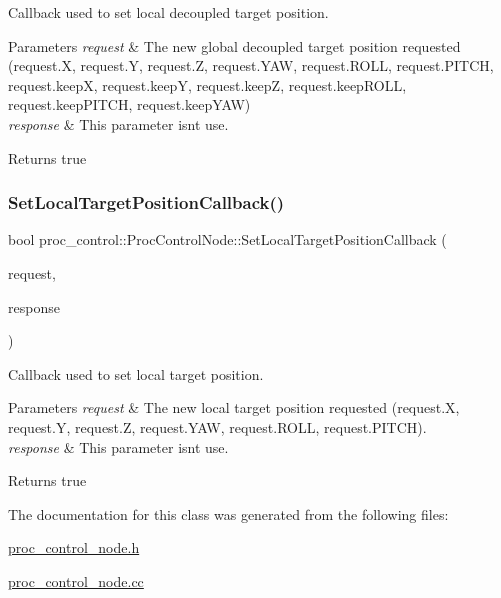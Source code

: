 Callback used to set local decoupled target position. 
\begin{DoxyParams}{Parameters}
{\em request} & The new global decoupled target position requested (request.\+X, request.\+Y, request.\+Z, request.\+Y\+AW, request.\+R\+O\+LL, request.\+P\+I\+T\+CH, request.\+keepX, request.\+keepY, request.\+keepZ, request.\+keep\+R\+O\+LL, request.\+keep\+P\+I\+T\+CH, request.\+keep\+Y\+AW) \\
\hline
{\em response} & This parameter isn\textquotesingle{}t use. \\
\hline
\end{DoxyParams}
\begin{DoxyReturn}{Returns}
true 
\end{DoxyReturn}
\mbox{\label{classproc__control_1_1_proc_control_node_ad331887883a3c1c44472d72dfced3db6}} 
\subsubsection{\texorpdfstring{Set\+Local\+Target\+Position\+Callback()}{SetLocalTargetPositionCallback()}}
{\footnotesize\ttfamily bool proc\+\_\+control\+::\+Proc\+Control\+Node\+::\+Set\+Local\+Target\+Position\+Callback (\begin{DoxyParamCaption}\item[{proc\+\_\+control\+::\+Set\+Position\+Target\+Request \&}]{request,  }\item[{proc\+\_\+control\+::\+Set\+Position\+Target\+Response \&}]{response }\end{DoxyParamCaption})}

Callback used to set local target position. 
\begin{DoxyParams}{Parameters}
{\em request} & The new local target position requested (request.\+X, request.\+Y, request.\+Z, request.\+Y\+AW, request.\+R\+O\+LL, request.\+P\+I\+T\+CH). \\
\hline
{\em response} & This parameter isn\textquotesingle{}t use. \\
\hline
\end{DoxyParams}
\begin{DoxyReturn}{Returns}
true 
\end{DoxyReturn}


The documentation for this class was generated from the following files\+:\begin{DoxyCompactItemize}
\item 
\hyperlink{proc__control__node_8h}{proc\+\_\+control\+\_\+node.\+h}\item 
\hyperlink{proc__control__node_8cc}{proc\+\_\+control\+\_\+node.\+cc}\end{DoxyCompactItemize}
